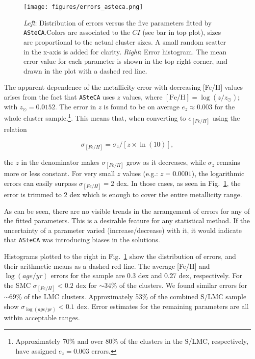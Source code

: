 \documentclass[draft]{aa}
\begin{document}
\begin{figure}[!ht]
\centering
\texttt{[image: figures/errors\_asteca.png]}
\caption{\emph{Left}: Distribution of errors versus the five parameters fitted
by \texttt{ASteCA}.\@ Colors are associated to the $CI$ (see bar in top plot),
sizes are proportional to the actual cluster sizes. A small random scatter in
the x-axis is added for clarity.
\emph{Right}: Error histogram. The mean error value for each parameter is shown
in the top right corner, and drawn in the plot with a dashed red line.}
\label{fig:errors}
\end{figure}

The apparent dependence of the metallicity error with decreasing [Fe/H] values
arises from the fact that \texttt{ASteCA} uses $z$ values, where
$\mathrm{[Fe/H]}{=}\log(z/z_{\odot})$; with $z_{\odot}{=}0.0152$.
The error in $z$ is found to be on average $e_z{\approx}0.003$ for the whole
cluster sample.\footnote{Approximately 70\% and over 80\% of the clusters in the
S/LMC, respectively, have assigned $e_z{=}0.003$ errors.}. This means that, when
converting to $e_{[Fe/H]}$ using the relation

\begin{equation}
\sigma_{[Fe/H]} = \sigma_z/[z\times\ln(10)],
\end{equation}

\noindent the $z$ in the denominator makes $\sigma_{[Fe/H]}$ grow as it
decreases, while $\sigma_z$ remains more or less constant.
For very small $z$ values (e.g.: $z{=}0.0001$), the
logarithmic errors can easily surpass $\sigma_{[Fe/H]}{=}2$ dex. In those cases,
as seen in Fig.~\ref{fig:errors}, the error is trimmed to 2 dex which is
enough to cover the entire metallicity range.

As can be seen, there are no visible trends in the arrangement of errors for any
of the fitted parameters. This is a desirable feature for any statistical
method. If the uncertainty of a parameter varied (increase/decrease) with it, it
would indicate that \texttt{ASteCA} was introducing biases in the solutions.

Histograms plotted to the right in Fig.~\ref{fig:errors} show the distribution
of errors, and their arithmetic means as a dashed red line.
The average [Fe/H] and $\log(age/yr)$ errors for the sample are 0.3 dex and
0.27 dex, respectively. For the SMC $\sigma_{[Fe/H]}{<}0.2$ dex for $\sim$34\%
of the clusters. We found similar errors for ${\sim}69\%$ of the LMC clusters.
Approximately 53\% of the combined S/LMC sample show
$\sigma_{\log(age/yr)}{<}0.1$ dex. Error estimates for the remaining parameters
are all within acceptable ranges.\\
\end{document}
